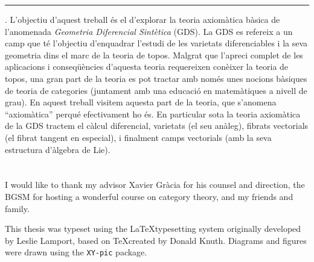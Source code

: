 \documentclass[12pt]{amsbook}
\begin{document}
\par\noindent\rule[0.2cm]{\textwidth}{0.4pt}

. L'objectiu d'aquest treball \'es el d'explorar la teoria axiom\`atica b\`asica de l'anomenada \emph{Geometria Diferencial Sint\`etica} (GDS). La GDS es refereix a un camp que t\'e l'objectiu d'enquadrar l'estudi de les varietats diferenciables i la seva geometria dins el marc de la teoria de topos. Malgrat que l'apreci complet de les aplicacions i conseq\"u\`encies d'aquesta teoria requereixen con\`eixer la teoria de topos, una gran part de la teoria es pot tractar amb nom\'es unes nocions b\`asiques de teoria de categories (juntament amb una educaci\'o en matem\`atiques a nivell de grau). En aquest treball visitem aquesta part de la teoria, que s'anomena ``axiom\`atica'' perqu\'e efectivament ho \'es. En particular sota la teoria axiom\`atica de la GDS tractem el c\`alcul diferencial, varietats (el seu an\`aleg), fibrats vectorials (el fibrat tangent en especial), i finalment camps vectorials (amb la seva estructura d'\`algebra de Lie).

\clearpage
\section*{}
I would like to thank my advisor Xavier Gràcia for his counsel and direction, the BGSM for hosting a wonderful course on category theory, and my friends and family.

This thesis was typeset using the \LaTeX typesetting system originally developed by Leslie Lamport, based on \TeX created by Donald Knuth. Diagrams and figures were drawn using the \texttt{XY-pic} package.
\tableofcontents


\mainmatter








\backmatter



\end{document}

